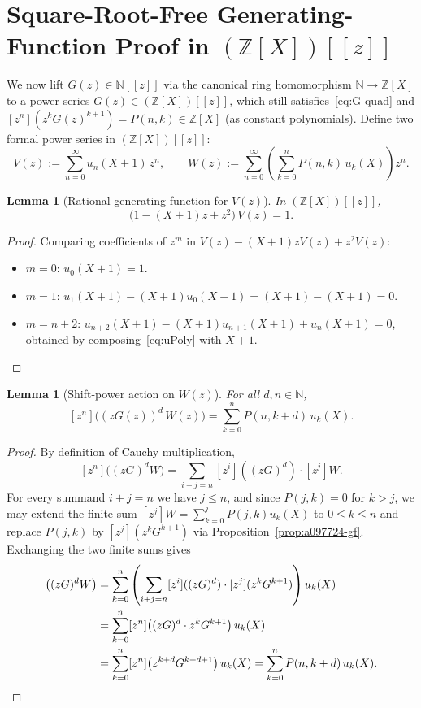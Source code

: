 \documentclass[11pt]{article}
\newcommand{\llbracket}{[\![}
\newcommand{\rrbracket}{]\!]}
\newtheorem{lemma}[theorem]{Lemma}
\theoremstyle{definition}
\newcommand{\N}{\mathbb{N}}
\newcommand{\Z}{\mathbb{Z}}
\begin{document}
\section{Square-Root-Free Generating-Function Proof in \texorpdfstring{$(\Z[X])\llbracket z \rrbracket$}{(Z[X])[[z]]}}

We now lift $G(z) \in \N\llbracket z \rrbracket$ via the canonical ring homomorphism $\N \to \Z[X]$ to a power series $G(z) \in (\Z[X])\llbracket z \rrbracket$, which still satisfies~\eqref{eq:G-quad} and $[z^n](z^k G(z)^{k+1}) = P(n, k) \in \Z[X]$ (as constant polynomials). Define two formal power series in $(\Z[X])\llbracket z \rrbracket$:
\begin{equation}
\label{eq:VW-def}
V(z) := \sum_{n=0}^{\infty} u_n(X + 1)\,z^n,
\qquad
W(z) := \sum_{n=0}^{\infty} \left(\sum_{k=0}^{n} P(n, k)\,u_k(X)\right) z^n.
\end{equation}

\begin{lemma}[Rational generating function for $V(z)$]
\label{lem:V-denom}
In $(\Z[X])\llbracket z \rrbracket$,
\[
\bigl(1 - (X + 1)z + z^2\bigr)\,V(z) = 1.
\]
\end{lemma}

\begin{proof}
Comparing coefficients of $z^m$ in $V(z) - (X+1) z V(z) + z^2 V(z)$:
\begin{itemize}
\item $m = 0$: $u_0(X+1) = 1$.
\item $m = 1$: $u_1(X+1) - (X+1) u_0(X+1) = (X+1) - (X+1) = 0$.
\item $m = n + 2$: $u_{n+2}(X+1) - (X+1) u_{n+1}(X+1) + u_n(X+1) = 0$, obtained by composing~\eqref{eq:uPoly} with $X + 1$. \qedhere
\end{itemize}
\end{proof}

\begin{lemma}[Shift-power action on $W(z)$]
\label{lem:shift-W}
For all $d, n \in \N$,
\[
[z^n]\bigl((z G(z))^d\, W(z)\bigr) = \sum_{k=0}^{n} P(n, k + d)\,u_k(X).
\]
\end{lemma}

\begin{proof}
By definition of Cauchy multiplication,
\[
[z^n]\bigl((z G)^d W\bigr) = \sum_{i + j = n} [z^i]((z G)^d) \cdot [z^j]W.
\]
For every summand $i + j = n$ we have $j \le n$, and since $P(j, k) = 0$ for $k > j$, we may extend the finite sum $[z^j]W = \sum_{k=0}^j P(j, k) u_k(X)$ to $0 \le k \le n$ and replace $P(j, k)$ by $[z^j](z^k G^{k+1})$ via Proposition~\ref{prop:a097724-gf}. Exchanging the two finite sums gives
\begin{align*}
[z^n]\bigl((z G)^d W\bigr)
&= \sum_{k=0}^{n} \left(\sum_{i + j = n} [z^i]((z G)^d) \cdot [z^j](z^k G^{k+1})\right) u_k(X) \\
&= \sum_{k=0}^{n} [z^n]\bigl((z G)^d \cdot z^k G^{k+1}\bigr)\,u_k(X) \\
&= \sum_{k=0}^{n} [z^n]\bigl(z^{k+d} G^{k+d+1}\bigr)\,u_k(X)
 = \sum_{k=0}^{n} P(n, k + d)\,u_k(X). \qedhere
\end{align*}
\end{proof}
\end{document}

